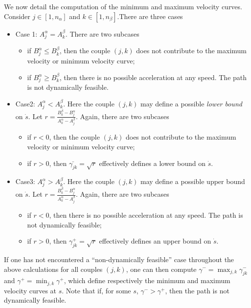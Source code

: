 \documentclass[journal]{IEEEtran}
\begin{document}
We now detail the computation of the minimum and maximum velocity curves. Consider $j\in [1, n_{\alpha}]$ and $k\in[1, n_{\beta}]$.There are three cases
\begin{itemize}
\item Case 1: $A _{j}^{\alpha}=A _{k}^{\beta}$. There are two subcases 

\begin{itemize}
\item if $B_{j}^{\alpha}\leq B_{k}^{\beta}$, then the couple $(j, k)$ does not contribute to the maximum velocity or minimum velocity curve;
\item if $B_{j}^{\alpha}\geq B_{k}^{\beta}$, then there is no possible acceleration at any speed. The path is not dynamically feasible.
\end{itemize}

\item Case2: $A _{j}^{\alpha}<A _{k}^{\beta}$. Here the couple $(j, k)$ may define a possible \emph{lower bound} on $\dot{s}$. Let $r=\frac{B^{\beta}_{k}-B^{\alpha}_{j}}{A^{\alpha}_{k}-A^{\beta}_{j}}$. Again, there are two subcases
\begin{itemize}
\item if $r<0$, then the couple $(j, k)$ does not contribute to the maximum velocity or minimum velocity curve;
\item if $r>0$, then $\bar{\gamma_{jk}}=\sqrt{r}$ effectively defines a lower bound on $\dot{s}$.
\end{itemize}

\item Case3: $A _{j}^{\alpha}>A _{k}^{\beta}$. Here the couple $(j, k)$ may define a possible upper bound on $\dot{s}$. Let $r=\frac{B^{\beta}_{k}-B^{\alpha}_{j}}{A^{\alpha}_{k}-A^{\beta}_{j}}$. Again, there are two subcases
\begin{itemize}
\item if $r<0$, then there is no possible acceleration at
any speed. The path is not dynamically feasible;
\item if $r>0$, then $\gamma_{jk}^{+}=\sqrt{r}$ effectively defines an
upper bound on $\dot{s}$.
\end{itemize}

\end{itemize}

If one has not encountered a “non-dynamically feasible” case throughout the above calculations for all couples $(j, k)$, one can then compute $\gamma^{-}=\max_{j,k}\gamma^{-}_{jk}$ and $\gamma^{+}=\min_{j,k}\gamma^{+}$, which define respectively the minimum and maximum velocity curves at $s$. Note that if, for some $s$,
$\gamma^{-}>\gamma^{+}$, then the path is not dynamically feasible.
\end{document}
